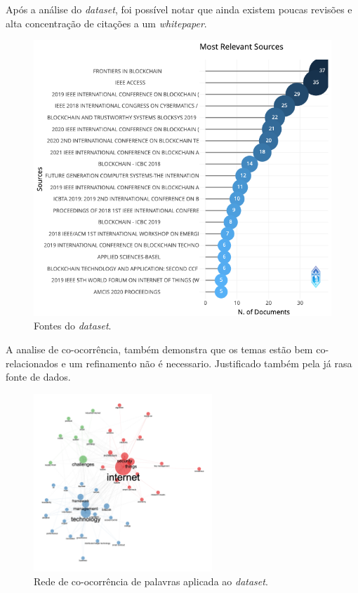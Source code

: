 Após a análise do \textit{dataset}, foi possível notar que ainda existem poucas revisões e alta concentração de citações a um \textit{whitepaper}.

\begin{figure}
    \centering
    \includegraphics[angle=0,width=1\textwidth]{experiments/Jaxiii/PesquisaBibliometrica/Blockchains/sources.png}
    \caption{Fontes do \textit{dataset}.}
    \label{fig:evol:anual:sources:blockchain@Jaxiii}
\end{figure}

A analise de co-ocorrência, também demonstra que os temas estão bem co-relacionados e um refinamento não é necessario. Justificado também pela já
rasa fonte de dados.

\begin{figure}[htp]
    \centering
    \includegraphics[width=0.6\textwidth]{experiments/Jaxiii/PesquisaBibliometrica/Blockchains/co-ocurrence.png}
    \caption{Rede de co-ocorrência de palavras aplicada ao \textit{dataset}.}
    \label{fig:blockchains@Jaxiii:redecoocorrencia}
\end{figure}


